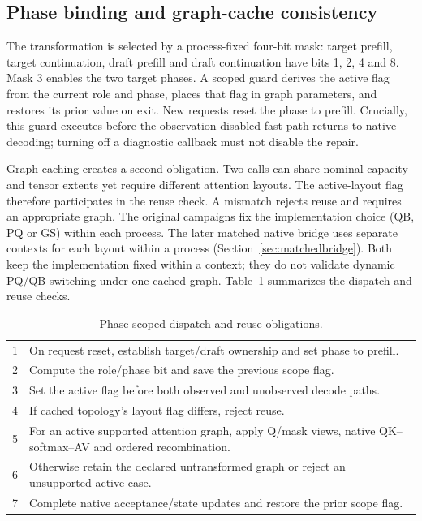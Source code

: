 \subsection{Phase binding and graph-cache consistency}
The transformation is selected by a process-fixed four-bit mask: target prefill, target continuation, draft prefill and draft continuation have bits 1, 2, 4 and 8. Mask 3 enables the two target phases. A scoped guard derives the active flag from the current role and phase, places that flag in graph parameters, and restores its prior value on exit. New requests reset the phase to prefill. Crucially, this guard executes before the observation-disabled fast path returns to native decoding; turning off a diagnostic callback must not disable the repair.

Graph caching creates a second obligation. Two calls can share nominal capacity and tensor extents yet require different attention layouts. The active-layout flag therefore participates in the reuse check. A mismatch rejects reuse and requires an appropriate graph. The original campaigns fix the implementation choice (QB, PQ or GS) within each process. The later matched native bridge uses separate contexts for each layout within a process (Section~\ref{sec:matchedbridge}). Both keep the implementation fixed within a context; they do not validate dynamic PQ/QB switching under one cached graph. Table~\ref{alg:scope} summarizes the dispatch and reuse checks.

\begin{table}[t]
\caption{Phase-scoped dispatch and reuse obligations.}
\label{alg:scope}
\begin{tabularx}{\columnwidth}{@{}rX@{}}\toprule
1 & On request reset, establish target/draft ownership and set phase to prefill.\\
2 & Compute the role/phase bit and save the previous scope flag.\\
3 & Set the active flag before both observed and unobserved decode paths.\\
4 & If cached topology's layout flag differs, reject reuse.\\
5 & For an active supported attention graph, apply Q/mask views, native QK--softmax--AV and ordered recombination.\\
6 & Otherwise retain the declared untransformed graph or reject an unsupported active case.\\
7 & Complete native acceptance/state updates and restore the prior scope flag.\\\bottomrule
\end{tabularx}
\end{table}

